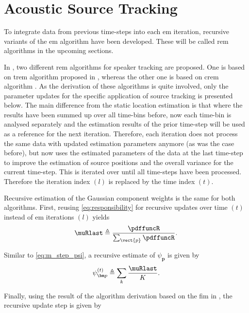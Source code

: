 \section{Acoustic Source Tracking}
\label{sec:algSrcTrack}

To integrate data from previous time-steps into each \gls{em} iteration, recursive variants of the \gls{em} algorithm have been developed. These will be called \gls{rem} algorithms in the upcoming sections.

In \cite{Schwartz2014}, two different \gls{rem} algorithms for speaker tracking are proposed. One is based on \gls{trem} algorithm proposed in \cite{Titterington1984}, whereas the other one is based on \gls{crem} algorithm \cite{Cappe2009}.
As the derivation of these algorithms is quite involved, only the parameter updates for the specific application of source tracking is presented below.
The main difference from the static location estimation is that where the results have been summed up over all time-bins before, now each time-bin is analysed separately and the estimation results of the prior time-step will be used as a reference for the next iteration. Therefore, each iteration does not process the same data with updated estimation parameters anymore (as was the case before), but now uses the estimated parameters of the data at the last time-step to improve the estimation of source positions and the overall variance for the current time-step. This is iterated over until all time-steps have been processed. Therefore the iteration index $(l)$ is replaced by the time index $(t)$.


Recursive estimation of the Gaussian component weights is the same for both algorithms. First, reusing \eqref{eq:responsibility} for recursive updates over time $(t)$ instead of \gls{em} iterations $(l)$ yields
\begin{equation}
    \muRlast \triangleq \frac{\pdffuncR}{\sum_{\vect{p}}\pdffuncR}.
\end{equation}

Similar to \eqref{eq:m_step_psi}, a recursive estimate of $\psi_{\bm p}$ is given by
\begin{equation}
    \psi_{\bm p}^{(t)}\triangleq\sum_k \frac{\muRlast}{K}.
\end{equation}

Finally, using the result of the algorithm derivation based on the \gls{fim} in \cite{Schwartz2014}, the recursive update step is given by

